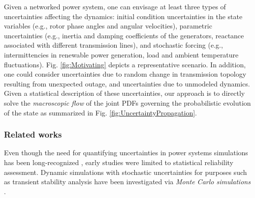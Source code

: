 \documentclass[10pt,twocolumn]{IEEEtran}
\begin{document}
Given a networked power system, one can envisage at least three types of uncertainties affecting the dynamics: initial condition uncertainties in the state variables (e.g., rotor phase angles and angular velocities), parametric uncertainties (e.g., inertia and damping coefficients of the generators, reactance associated with different transmission lines), and stochastic forcing (e.g., intermittencies in renewable power generation, load and ambient temperature fluctuations). Fig. \ref{fig:Motivating} depicts a representative scenario. In addition, one could consider uncertainties due to random change in transmission topology resulting from unexpected outage, and uncertainties due to unmodeled dynamics. Given a statistical description of these uncertainties, our approach is to directly solve the \emph{macroscopic flow} of the joint PDFs governing the probabilistic evolution of the state as summarized in Fig. \ref{fig:UncertaintyPropagation}.


\subsubsection{Related works}
Even though the need for quantifying uncertainties in power systems simulations has been long-recognized \cite{allan8791,allan9296}, early studies were limited to statistical reliability assessment. Dynamic simulations with stochastic uncertainties for purposes such as transient stability analysis have been investigated via \emph{Monte Carlo simulations} \cite{timko1983monte,dong2012numerical,perninge2012importance,odun2012structure}.
\end{document}
